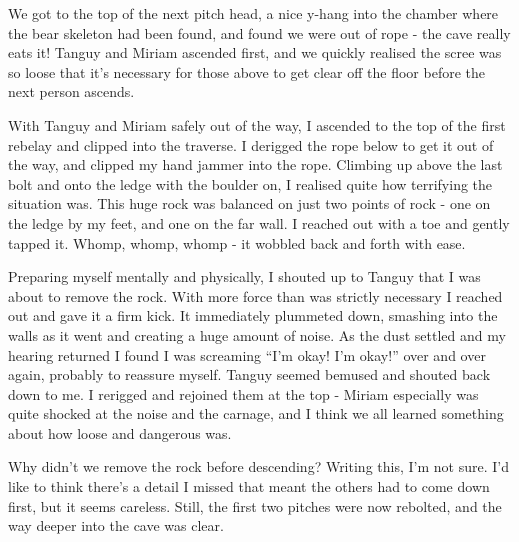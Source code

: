 We got to the top of the next pitch head, a nice y-hang into the chamber where the bear skeleton had been found, and found we were out of rope - the cave really eats it! Tanguy and Miriam ascended first, and we quickly realised the scree was so loose that it’s necessary for those above to get clear off the floor before the next person ascends.

With Tanguy and Miriam safely out of the way, I ascended to the top of the first rebelay and clipped into the traverse. I derigged the rope below to get it out of the way, and clipped my hand jammer into the rope. Climbing up above the last bolt and onto the ledge with the boulder on, I realised quite how terrifying the situation was. This huge rock was balanced on just two points of rock - one on the ledge by my feet, and one on the far wall. I reached out with a toe and gently tapped it. Whomp, whomp, whomp - it wobbled back and forth with ease. 

Preparing myself mentally and physically, I shouted up to Tanguy that I was about to remove the rock. With more force than was strictly necessary I reached out and gave it a firm kick. It immediately plummeted down, smashing into the walls as it went and creating a huge amount of noise. As the dust settled and my hearing returned I found I was screaming “I’m okay! I’m okay!” over and over again, probably to reassure myself. Tanguy seemed bemused and shouted back down to me. I rerigged and rejoined them at the top - Miriam especially was quite shocked at the noise and the carnage, and I think we all learned something about how loose and dangerous  was.

Why didn’t we remove the rock before descending? Writing this, I’m not sure. I’d like to think there’s a detail I missed that meant the others had to come down first, but it seems careless. Still, the first two pitches were now rebolted, and the way deeper into the cave was clear.


